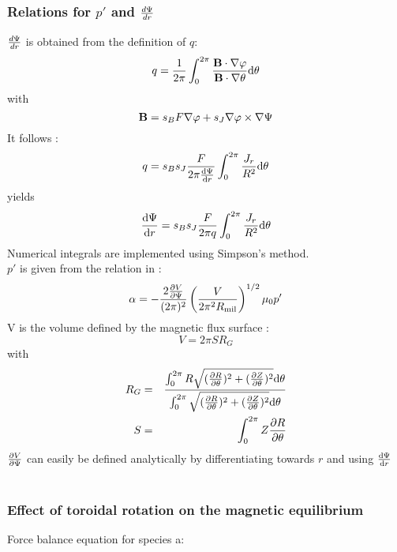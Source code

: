\subsubsection{Relations for $p'$ and ${d\Psi \over dr}$}
${d\Psi \over dr}$ is obtained from the definition of $q$:
\begin{equation}
q = {1 \over 2 \pi} \int_0^{2\pi} {{{\bf B} \cdot \nabla \varphi \over {\bf B} \cdot \nabla \theta}\mathrm{d}\theta} 
\end{equation}
with 
\begin{equation}
{\bf B} = s_B F \nabla \varphi + s_J \nabla \varphi \times \nabla \Psi
\end{equation}
It follows : 
\begin{equation}
q = s_B s_J{F \over 2 \pi {\mathrm{d}\Psi \over \mathrm{d}r}} \int_0^{2\pi}{{J_r \over R^2}\mathrm{d}\theta}
\end{equation}
yields 
\begin{equation}
{\mathrm{d}\Psi \over \mathrm{d}r} = s_B s_J{F \over 2 \pi q} \int_0^{2\pi}{{J_r \over R^2}\mathrm{d}\theta}
\end{equation}
Numerical integrals are implemented using Simpson's method. \\
$p'$ is given from the relation in \cite{MIL98}:
\begin{equation}
\alpha = -{2\frac{\partial  V}{\partial \Psi} \over (2 \pi)^2}\left({V \over 2 \pi^2 R_{
\rm mil}}\right)^{1/2} \mu_0 p^\prime
\end{equation}
V is the volume defined by the magnetic flux surface :
\begin{equation}
V = 2 \pi S R_G
\end{equation}
with
\begin{eqnarray}
R_G &=& {\int_0^{2\pi} {R \sqrt{(\frac{\partial  R}{\partial \theta})^2 + (\frac{\partial  Z}{\partial \theta})^2} \mathrm{d}\theta} \over \int_0^{2\pi} {\sqrt{(\frac{\partial  R}{\partial \theta})^2 + (\frac{\partial  Z}{\partial \theta})^2} \mathrm{d}\theta}} \\
S &=& \int_0^{2\pi} {Z\frac{\partial  R}{\partial \theta}}
\end{eqnarray}
$\frac{\partial  V}{\partial \Psi}$ can easily be defined analytically by differentiating towards $r$ and using ${\mathrm{d}\Psi \over \mathrm{d}r}$ \\
\\
 
\subsubsection{Effect of toroidal rotation on the magnetic equilibrium}
Force balance equation for species a:

